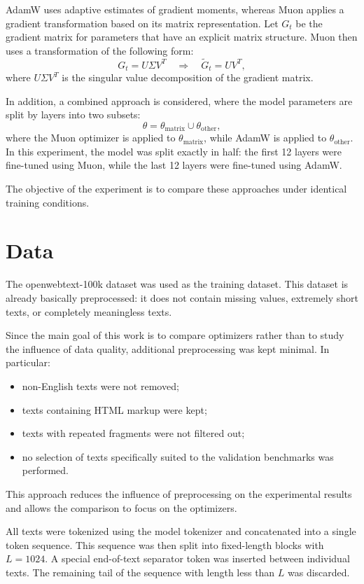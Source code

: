 \documentclass{article}
\begin{document}
AdamW uses adaptive estimates of gradient moments, whereas Muon applies a gradient transformation based on its matrix representation. Let $G_t$ be the gradient matrix for parameters that have an explicit matrix structure. Muon then uses a transformation of the following form:
\[
G_t = U \Sigma V^T \quad \Rightarrow \quad \tilde{G}_t = U V^T,
\]
where $U \Sigma V^T$ is the singular value decomposition of the gradient matrix.

In addition, a combined approach is considered, where the model parameters are split by layers into two subsets:
\[
\theta = \theta_{\text{matrix}} \cup \theta_{\text{other}},
\]
where the Muon optimizer is applied to $\theta_{\text{matrix}}$, while AdamW is applied to $\theta_{\text{other}}$. In this experiment, the model was split exactly in half: the first 12 layers were fine-tuned using Muon, while the last 12 layers were fine-tuned using AdamW.

The objective of the experiment is to compare these approaches under identical training conditions.

\section{Data}

The openwebtext-100k dataset was used as the training dataset. This dataset is already basically preprocessed: it does not contain missing values, extremely short texts, or completely meaningless texts.

Since the main goal of this work is to compare optimizers rather than to study the influence of data quality, additional preprocessing was kept minimal. In particular:
\begin{itemize}
    \item non-English texts were not removed;
    \item texts containing HTML markup were kept;
    \item texts with repeated fragments were not filtered out;
    \item no selection of texts specifically suited to the validation benchmarks was performed.
\end{itemize}

This approach reduces the influence of preprocessing on the experimental results and allows the comparison to focus on the optimizers.

All texts were tokenized using the model tokenizer and concatenated into a single token sequence. This sequence was then split into fixed-length blocks with $L = 1024$. A special end-of-text separator token was inserted between individual texts. The remaining tail of the sequence with length less than $L$ was discarded.
\end{document}
